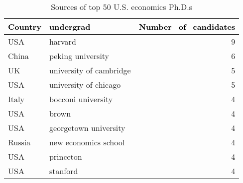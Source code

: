 \begin{table}[H]

\caption{Sources of top 50 U.S. economics Ph.D.s}
\centering
\fontsize{8}{10}\selectfont
\begin{tabular}[t]{l|l|r}
\hline
\textcolor{black}{\textbf{Country}} & \textcolor{black}{\textbf{undergrad}} & \textcolor{black}{\textbf{Number\_of\_candidates}}\\
\hline
USA & harvard & 9\\
\hline
China & peking university & 6\\
\hline
UK & university of cambridge & 5\\
\hline
USA & university of chicago & 5\\
\hline
Italy & bocconi university & 4\\
\hline
USA & brown & 4\\
\hline
USA & georgetown university & 4\\
\hline
Russia & new economics school & 4\\
\hline
USA & princeton & 4\\
\hline
USA & stanford & 4\\
\hline
\end{tabular}
\end{table}
